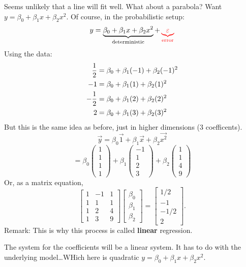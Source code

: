 \nl Seems unlikely that a line will fit well. What about a parabola? Want $y = \beta_0 + \beta_1x + \beta_2x^2$. Of course, in the probabilistic setup:
$$y = \underbrace{\beta_0 + \beta_1x + \beta_2x^2}_{\text{deterministic}} + \color{red} \underbrace{ \varepsilon}_{\text{error}}$$
Using the data:
\begin{align*}
    \over{2} &= \beta_0 + \beta_1(-1) + \beta_2(-1)^2\\
    -1 &= \beta_0 + \beta_1(1) + \beta_2(1)^2 \\
    -\over{2} &= \beta_0 + \beta_1(2) + \beta_2(2)^2\\
    2 &= \beta_0 + \beta_1(3) + \beta_2(3)^2
\end{align*}
But this is the same idea as before, just in higher dimensions (3 coefficents).
$$\vec y = \beta_0 \vec 1 + \beta_1 \vec x + \beta_2 \vec{x^2}$$
$$= \beta_0 \begin{pmatrix}
    1\\1\\1\\1
\end{pmatrix} + \beta_1 \begin{pmatrix}
    -1\\1\\2\\3
\end{pmatrix} + \beta_2 \begin{pmatrix}
    1\\1\\4\\9
\end{pmatrix}$$
Or, as a matrix equation,
$$\begin{bmatrix}
    1 & -1 & 1\\ 1 & 1 & 1 \\ 1 & 2 & 4 \\ 1 & 3 & 9
\end{bmatrix} \begin{bmatrix}
    \beta_0 \\ \beta_1 \\ \beta_2
\end{bmatrix} = \begin{bmatrix}
    1/2 \\ -1 \\ -1/2 \\ 2
\end{bmatrix}.$$
Remark: This is why this process is called \textbf{linear} regression.

\nl The system for the coefficients will be a linear system. It has  to do with the underlying model\dots WHich here is quadratic $y = \beta_0 + \beta_1 x + \beta_2 x^2$.

